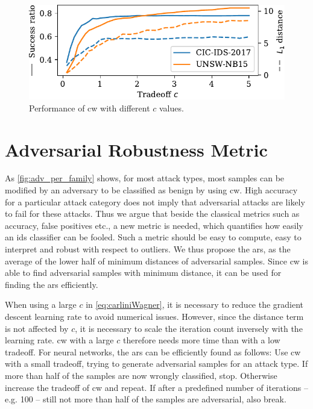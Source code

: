 \documentclass[conference]{IEEEtran}
\begin{document}
\begin{figure}[b]
\includegraphics[width=\columnwidth]{../plots/adv_comparison/tradeoff.pdf}
\caption{Performance of \gls{cw} with different $c$ values.}
\label{fig:adv_cw}
\end{figure}

\section{Adversarial Robustness Metric}

As \autoref{fig:adv_per_family} shows, for most attack types, most samples can be modified by an adversary to be classified as benign by using \gls{cw}. High accuracy for a particular attack category does not imply that adversarial attacks are  likely to fail for these attacks. Thus we argue that beside the classical metrics such as accuracy, false positives etc., a new metric is needed, which quantifies how easily an \gls{ids} classifier can be fooled.
Such a metric should be easy to compute, easy to interpret and robust with respect to outliers.  We thus propose the \gls{ars}, as the average of the lower half  of minimum distances of adversarial samples. Since \gls{cw} is able to find adversarial samples with minimum distance, it can be used for finding the \gls{ars}  efficiently. 

When using a large $c$ in \autoref{eq:carliniWagner}, it is necessary to reduce the gradient descent learning rate  to avoid numerical issues. However, since the distance term is not affected by $c$, it is necessary to scale the iteration count inversely with the learning rate. \gls{cw} with a large $c$ therefore needs more time than with a low tradeoff. For neural networks, the \gls{ars} can be efficiently found as follows: Use \gls{cw} with a small tradeoff, trying to generate adversarial samples for an attack type. If more than half of the samples are now wrongly classified, stop. Otherwise increase the tradeoff of \gls{cw} and repeat. If after a predefined number of iterations -- e.g. 100 -- still not more than half of the samples are adversarial, also break.
\end{document}
